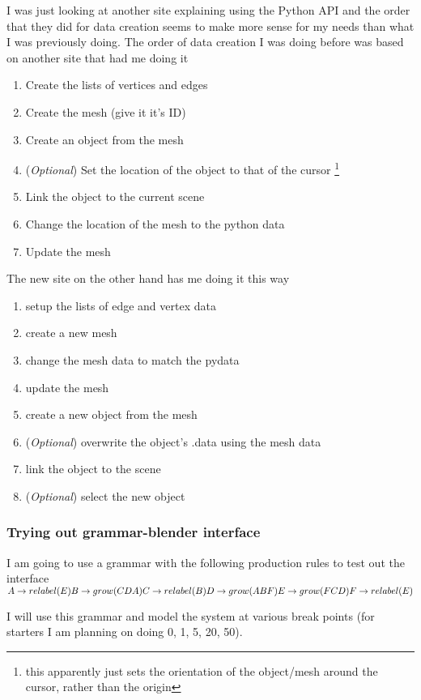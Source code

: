 \documentclass[letterpaper,oneside,titlepage]{article}
\begin{document}
I was just looking at another site explaining using the Python API and the order that they did for data creation seems to make more sense for my needs than what I was previously doing.  The order of data creation I was doing before was based on another site that had me doing it
\begin{enumerate}
\item Create the lists of vertices and edges
\item Create the mesh (give it it's ID)
\item Create an object from the mesh
\item (\emph{Optional}) Set the location of the object to that of the cursor \footnote{this apparently just sets the orientation of the object/mesh around the cursor, rather than the origin}
\item Link the object to the current scene
\item Change the location of the mesh to the python data
\item Update the mesh
\end{enumerate}
The new site on the other hand has me doing it this way
\begin{enumerate}
\item setup the lists of edge and vertex data
\item create a new mesh
\item change the mesh data to match the pydata
\item update the mesh
\item create a new object from the mesh
\item (\emph{Optional}) overwrite the object's .data using the mesh data
\item link the object to the scene
\item (\emph{Optional}) select the new object
\end{enumerate}

\subsubsection*{Trying out grammar-blender interface}
I am going to use a grammar with the following production rules to test out the interface
\begin{math}
  A \to relabel(E) \\
  B \to grow(CDA)  \\
  C \to relabel(B) \\
  D \to grow(ABF)  \\
  E \to grow(FCD)  \\
  F \to relabel(E)
\end{math}

I will use this grammar and model the system at various break points (for starters I am planning on doing 0, 1, 5, 20, 50).





\end{document}
